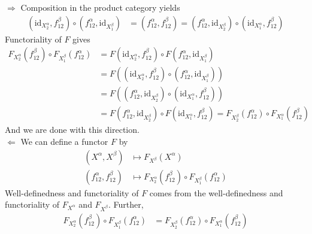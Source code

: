 \begin{prf}
{\glqq}$\Rightarrow${\grqq}
\qquad
Composition in the product category yields
\begin{align*}
  \left(
    \mathrm{id}_{X_{2}^{\alpha}},
    f_{12}^{\beta}
  \right)
  \circ
  \left(
    f_{12}^{\alpha},
    \mathrm{id}_{X_{1}^{\beta}}
  \right)
  &=
  (f_{12}^{\alpha},f_{12}^{\beta})
  =
  \left(
    f_{12}^{\alpha},
    \mathrm{id}_{X_{2}^{\beta}}
  \right)
  \circ
  \left(
    \mathrm{id}_{X_{1}^{\alpha}},
    f_{12}^{\beta}
  \right)
\end{align*}
Functoriality of $F$ gives
\begin{align*}
  F_{X_{2}^{\alpha}}(f_{12}^{\beta})
  \circ
  F_{X_{1}^{\beta}}(f_{12}^{\alpha})
  &=
  F
  \left(
    \mathrm{id}_{X_{2}^{\alpha}},
    f_{12}^{\beta}
  \right)
  \circ
  F
  \left(
    f_{12}^{\alpha},
    \mathrm{id}_{X_{1}^{\beta}}
  \right)
  \\
  &=
  F
  \left(
    \left(
      \mathrm{id}_{X_{2}^{\alpha}},
      f_{12}^{\beta}
    \right)
    \circ
    \left(
      f_{12}^{\alpha},
      \mathrm{id}_{X_{1}^{\beta}}
    \right)
  \right)
  \\
  &=
  F
  \left(
    \left(
      f_{12}^{\alpha},
      \mathrm{id}_{X_{2}^{\beta}}
    \right)
    \circ
    \left(
      \mathrm{id}_{X_{1}^{\alpha}},
      f_{12}^{\beta}
    \right)
  \right)
  \\
  &=
  F
  \left(
    f_{12}^{\alpha},
    \mathrm{id}_{X_{2}^{\beta}}
  \right)
  \circ
  F
  \left(
    \mathrm{id}_{X_{1}^{\alpha}},
    f_{12}^{\beta}
  \right)
  =
  F_{X_{2}^{\beta}}(f_{12}^{\alpha})
  \circ
  F_{X_{1}^{\alpha}}(f_{12}^{\beta})
\end{align*}
And we are done with this direction.
\\
{\glqq}$\Leftarrow${\grqq}
\qquad
We can define a functor $F$ by
\begin{align*}
  (X^{\alpha},X^{\beta})
  &\mapsto
  F_{X^{\beta}}(X^{\alpha})
  \\
  (f_{12}^{\alpha},f_{12}^{\beta})
  &\mapsto
  F_{X_{2}^{\alpha}}(f_{12}^{\beta})
  \circ
  F_{X_{1}^{\beta}}(f_{12}^{\alpha})
\end{align*}
Well-definedness and functoriality of $F$ comes from the well-definedness and functoriality of $F_{X^{\alpha}}$ and $F_{X^{\beta}}$. Further,
\begin{align*}
  F_{X_{2}^{\alpha}}(f_{12}^{\beta})
  \circ
  F_{X_{1}^{\beta}}(f_{12}^{\alpha})
  &=
  F_{X_{2}^{\beta}}(f_{12}^{\alpha})
  \circ
  F_{X_{1}^{\alpha}}(f_{12}^{\beta})

\end{align*}
\end{prf}
